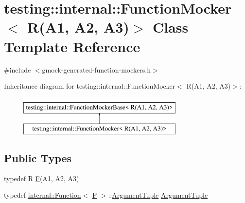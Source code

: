 \hypertarget{classtesting_1_1internal_1_1FunctionMocker_3_01R_07A1_00_01A2_00_01A3_08_4}{}\section{testing\+::internal\+::Function\+Mocker$<$ R(A1, A2, A3)$>$ Class Template Reference}
\label{classtesting_1_1internal_1_1FunctionMocker_3_01R_07A1_00_01A2_00_01A3_08_4}


{\ttfamily \#include $<$gmock-\/generated-\/function-\/mockers.\+h$>$}

Inheritance diagram for testing\+::internal\+::Function\+Mocker$<$ R(A1, A2, A3)$>$\+:\begin{figure}[H]
\begin{center}
\leavevmode
\includegraphics[height=2.000000cm]{classtesting_1_1internal_1_1FunctionMocker_3_01R_07A1_00_01A2_00_01A3_08_4}
\end{center}
\end{figure}
\subsection*{Public Types}
\begin{DoxyCompactItemize}
\item 
typedef R \mbox{\hyperlink{classtesting_1_1internal_1_1FunctionMocker_3_01R_07A1_00_01A2_00_01A3_08_4_a8c471830f963b8012785eb3eeca2cc9c}{F}}(A1, A2, A3)
\item 
typedef \mbox{\hyperlink{structtesting_1_1internal_1_1Function}{internal\+::\+Function}}$<$ \mbox{\hyperlink{classtesting_1_1internal_1_1FunctionMocker_3_01R_07A1_00_01A2_00_01A3_08_4_a8c471830f963b8012785eb3eeca2cc9c}{F}} $>$\+::\mbox{\hyperlink{classtesting_1_1internal_1_1FunctionMocker_3_01R_07A1_00_01A2_00_01A3_08_4_a347dcf4c054a5f1fbd0e2f0ad1c5e2f3}{Argument\+Tuple}} \mbox{\hyperlink{classtesting_1_1internal_1_1FunctionMocker_3_01R_07A1_00_01A2_00_01A3_08_4_a347dcf4c054a5f1fbd0e2f0ad1c5e2f3}{Argument\+Tuple}}
\end{DoxyCompactItemize}
